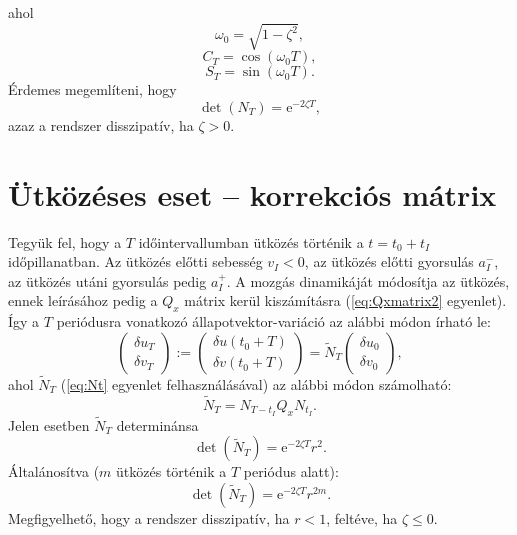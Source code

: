 ahol 
\begin{equation}
\omega_0=\sqrt{1-\zeta^2},
\end{equation}
\begin{equation}
C_T=\cos(\omega_0T),
\end{equation}
\begin{equation}
S_T=\sin(\omega_0T).
\end{equation}
Érdemes megemlíteni, hogy 
\begin{equation}
\det\left(N_T \right)=\mathrm{e}^{-2\zeta T},
\end{equation}
azaz a rendszer disszipatív, ha $\zeta>0$.

\section{Ütközéses eset -- korrekciós mátrix}

Tegyük fel, hogy a $T$ időintervallumban ütközés történik a $t=t_0+t_I$ időpillanatban. Az ütközés előtti sebesség $v_I<0$, az ütközés előtti gyorsulás $a_I^-$, az ütközés utáni gyorsulás pedig $a_I^+$. A mozgás dinamikáját módosítja az ütközés, ennek leírásához pedig a $Q_x$ mátrix kerül kiszámításra (\eqref{eq:Qxmatrix2} egyenlet). Így a $T$ periódusra vonatkozó állapotvektor-variáció az alábbi módon írható le:
\begin{equation}
\begin{pmatrix}
\delta u_T\\ \delta v_T
\end{pmatrix}:=
\begin{pmatrix}
\delta u(t_0+T)\\
\delta v(t_0+T)
\end{pmatrix}
=\tilde{N}_T\begin{pmatrix}
\delta u_0\\ \delta v_0
\end{pmatrix},
\end{equation}
ahol $\tilde{N}_T$ (\eqref{eq:Nt} egyenlet felhasználásával) az alábbi módon számolható:
\begin{equation}
\tilde{N}_T=N_{T-t_I}Q_xN_{t_I}.
\end{equation}
Jelen esetben $\tilde{N}_T$ determinánsa
\begin{equation}
\det\left( \tilde{N}_T\right)=\mathrm{e}^{-2\zeta T}r^2.
\end{equation}
Általánosítva ($m$ ütközés történik a $T$ periódus alatt):
\begin{equation}
\det\left(\tilde{N}_T \right)=\mathrm{e}^{-2\zeta T}r^{2m}.
\end{equation}
Megfigyelhető, hogy a rendszer disszipatív, ha $r<1$, feltéve, ha $\zeta \leq 0$.

